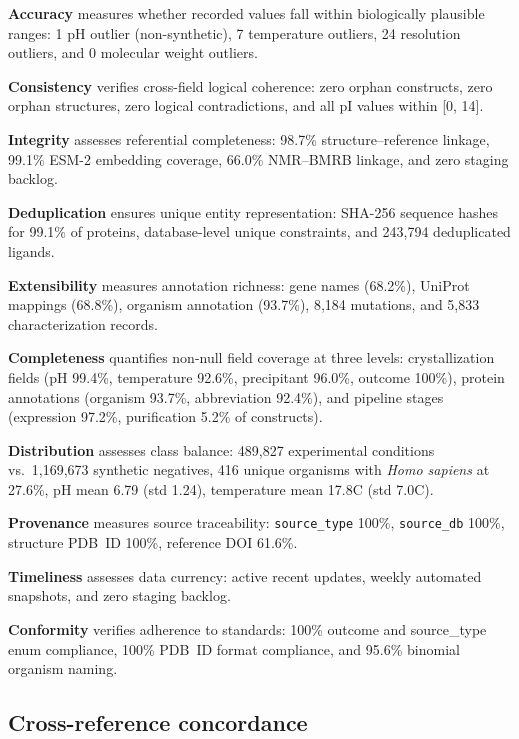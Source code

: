 \documentclass[11pt]{article}
\begin{document}
\textbf{Accuracy} measures whether recorded values fall within biologically plausible ranges: 1 pH outlier (non-synthetic), 7 temperature outliers, 24 resolution outliers, and 0 molecular weight outliers.

\textbf{Consistency} verifies cross-field logical coherence: zero orphan constructs, zero orphan structures, zero logical contradictions, and all pI values within [0, 14].

\textbf{Integrity} assesses referential completeness: 98.7\% structure--reference linkage, 99.1\% ESM-2 embedding coverage, 66.0\% NMR--BMRB linkage, and zero staging backlog.

\textbf{Deduplication} ensures unique entity representation: SHA-256 sequence hashes for 99.1\% of proteins, database-level unique constraints, and 243,794 deduplicated ligands.

\textbf{Extensibility} measures annotation richness: gene names (68.2\%), UniProt mappings (68.8\%), organism annotation (93.7\%), 8,184 mutations, and 5,833 characterization records.

\textbf{Completeness} quantifies non-null field coverage at three levels: crystallization fields (pH 99.4\%, temperature 92.6\%, precipitant 96.0\%, outcome 100\%), protein annotations (organism 93.7\%, abbreviation 92.4\%), and pipeline stages (expression 97.2\%, purification 5.2\% of constructs).

\textbf{Distribution} assesses class balance: 489,827 experimental conditions vs.\ 1,169,673 synthetic negatives, 416 unique organisms with \textit{Homo sapiens} at 27.6\%, pH mean 6.79 (std 1.24), temperature mean 17.8\textdegree C (std 7.0\textdegree C).

\textbf{Provenance} measures source traceability: \texttt{source\_type} 100\%, \texttt{source\_db} 100\%, structure PDB~ID 100\%, reference DOI 61.6\%.

\textbf{Timeliness} assesses data currency: active recent updates, weekly automated snapshots, and zero staging backlog.

\textbf{Conformity} verifies adherence to standards: 100\% outcome and source\_type enum compliance, 100\% PDB~ID format compliance, and 95.6\% binomial organism naming.

\subsection*{Cross-reference concordance}
\end{document}
